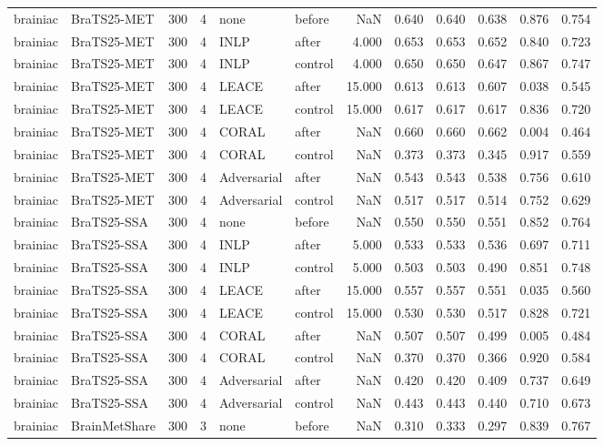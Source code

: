 \begin{tabular}{llrrllrrrrrr}
brainiac & BraTS25-MET & 300 & 4 & none & before & NaN & 0.640 & 0.640 & 0.638 & 0.876 & 0.754 \\
brainiac & BraTS25-MET & 300 & 4 & INLP & after & 4.000 & 0.653 & 0.653 & 0.652 & 0.840 & 0.723 \\
brainiac & BraTS25-MET & 300 & 4 & INLP & control & 4.000 & 0.650 & 0.650 & 0.647 & 0.867 & 0.747 \\
brainiac & BraTS25-MET & 300 & 4 & LEACE & after & 15.000 & 0.613 & 0.613 & 0.607 & 0.038 & 0.545 \\
brainiac & BraTS25-MET & 300 & 4 & LEACE & control & 15.000 & 0.617 & 0.617 & 0.617 & 0.836 & 0.720 \\
brainiac & BraTS25-MET & 300 & 4 & CORAL & after & NaN & 0.660 & 0.660 & 0.662 & 0.004 & 0.464 \\
brainiac & BraTS25-MET & 300 & 4 & CORAL & control & NaN & 0.373 & 0.373 & 0.345 & 0.917 & 0.559 \\
brainiac & BraTS25-MET & 300 & 4 & Adversarial & after & NaN & 0.543 & 0.543 & 0.538 & 0.756 & 0.610 \\
brainiac & BraTS25-MET & 300 & 4 & Adversarial & control & NaN & 0.517 & 0.517 & 0.514 & 0.752 & 0.629 \\
brainiac & BraTS25-SSA & 300 & 4 & none & before & NaN & 0.550 & 0.550 & 0.551 & 0.852 & 0.764 \\
brainiac & BraTS25-SSA & 300 & 4 & INLP & after & 5.000 & 0.533 & 0.533 & 0.536 & 0.697 & 0.711 \\
brainiac & BraTS25-SSA & 300 & 4 & INLP & control & 5.000 & 0.503 & 0.503 & 0.490 & 0.851 & 0.748 \\
brainiac & BraTS25-SSA & 300 & 4 & LEACE & after & 15.000 & 0.557 & 0.557 & 0.551 & 0.035 & 0.560 \\
brainiac & BraTS25-SSA & 300 & 4 & LEACE & control & 15.000 & 0.530 & 0.530 & 0.517 & 0.828 & 0.721 \\
brainiac & BraTS25-SSA & 300 & 4 & CORAL & after & NaN & 0.507 & 0.507 & 0.499 & 0.005 & 0.484 \\
brainiac & BraTS25-SSA & 300 & 4 & CORAL & control & NaN & 0.370 & 0.370 & 0.366 & 0.920 & 0.584 \\
brainiac & BraTS25-SSA & 300 & 4 & Adversarial & after & NaN & 0.420 & 0.420 & 0.409 & 0.737 & 0.649 \\
brainiac & BraTS25-SSA & 300 & 4 & Adversarial & control & NaN & 0.443 & 0.443 & 0.440 & 0.710 & 0.673 \\
brainiac & BrainMetShare & 300 & 3 & none & before & NaN & 0.310 & 0.333 & 0.297 & 0.839 & 0.767 \\

\end{tabular}

